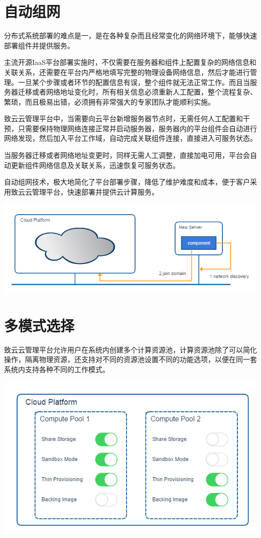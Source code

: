 \documentclass[letterpaper,10pt]{sphinxmanual}
\begin{document}
\section{自动组网}
\label{index:id14}
分布式系统部署的难点是一，是在各种复杂而且经常变化的网络环境下，能够快速部署组件并提供服务。

主流开源IaaS平台部署实施时，不仅需要在服务器和组件上配置复杂的网络信息和关联关系，还需要在平台内严格地填写完整的物理设备网络信息，然后才能进行管理。一旦某个步骤或者环节的配置信息有误，整个组件就无法正常工作。而且当服务器迁移或者网络地址变化时，所有相关信息必须重新人工配置，整个流程复杂、繁琐，而且极易出错，必须拥有非常强大的专家团队才能顺利实施。

致云云管理平台中，当需要向云平台新增服务器节点时，无需任何人工配置和干预，只需要保持物理网络连接正常并启动服务器，服务器内的平台组件会自动进行网络发现，然后加入平台工作域，自动完成关联组件连接，直接进入可服务状态。

当服务器迁移或者网络地址变更时，同样无需人工调整，直接加电可用，平台会自动更新组件网络信息及关联关系，迅速恢复可服务状态。

自动组网技术，极大地简化了平台部署步骤，降低了维护难度和成本，便于客户采用致云云管理平台，快速部署并提供云计算服务。

\includegraphics{3_2_auto_deployment.png}


\section{多模式选择}
\label{index:id15}
致云云管理平台允许用户在系统内创建多个计算资源池，计算资源池除了可以简化操作，隔离物理资源，还支持对不同的资源池设置不同的功能选项，以便在同一套系统内支持各种不同的工作模式。

\includegraphics{3_3_multimode.png}
\end{document}
